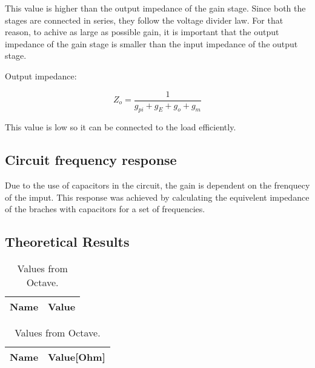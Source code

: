 This value is higher than the output impedance of the gain stage. Since both the stages are connected in series, they follow the voltage divider law. For that reason, to achive as large as possible gain, it is important that the output impedance of the gain stage is smaller than the input impedance of the output stage.

Output impedance:

\[
Z_o = \frac{1}{g_{pi}+g_E+g_o+g_m}
\]

This value is low so it can be connected to the load efficiently.

\subsection {Circuit frequency response}
Due to the use of capacitors in the circuit, the gain is dependent on the frenquecy of the imput. This response was achieved by calculating the equivelent impedance of the braches with capacitors for a set of frequencies.




\subsection{Theoretical Results}
\label{subsec:res_the}

\begin{table}[h]
	\centering
	\begin{tabular}{|l|r|}
		\hline    
		{\bf Name} & {\bf Value} \\ \hline
    		
	\end{tabular}
	
	\caption{Values from Octave.}
    
\label{tab:op_teo}
\end{table}

\begin{table}[h]
	\centering
	\begin{tabular}{|l|r|}
		\hline    
		{\bf Name} & {\bf Value[Ohm]} \\ \hline
    		
	\end{tabular}
	
	\caption{Values from Octave.}
    
\label{tab:imp_teo}
\end{table}
